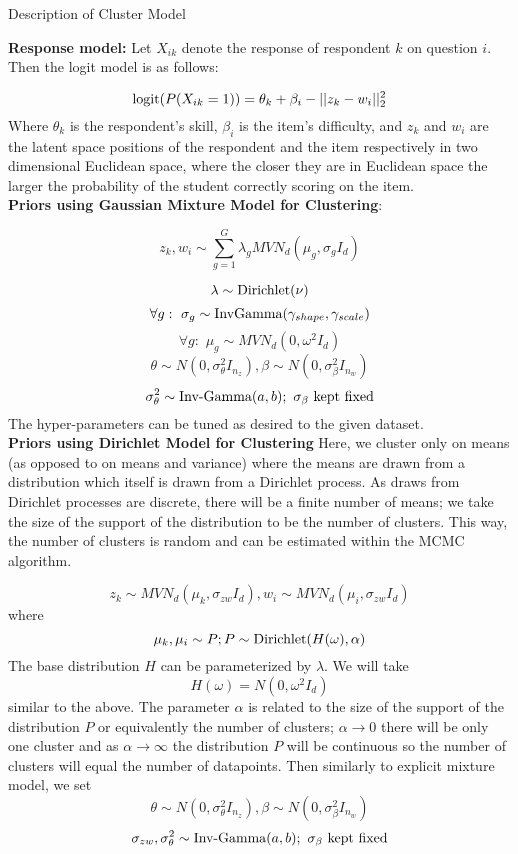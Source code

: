 \documentclass[12pt]{article}
\newcommand{\tx}[1]{\textnormal{#1}}
\begin{document}
	
	\begin{center}
		Description of Cluster Model
	\end{center}
	
\textbf{Response model:} Let $X_{ik}$ denote the response of respondent $k$ on question $i$. Then the logit model is as follows:

$$\tx{logit}(P(X_{ik}=1))=\theta_k+\beta_i-||z_k-w_i||_2^2$$ Where $\theta_k$ is the respondent's skill, $\beta_i$ is the item's difficulty, and $z_k$ and $w_i$ are the latent space positions of the respondent and the item respectively in two dimensional Euclidean space, where the closer they are in Euclidean space the larger the probability of the student correctly scoring on the item.\\


\textbf{Priors using Gaussian Mixture Model for Clustering}:

$$z_k,w_i\sim\sum_{g=1}^{G}\lambda_{g}MVN_d(\mu_{g},\sigma_{g}I_d)$$



$$\lambda\sim \tx{Dirichlet}(\nu)$$ $$\forall g:\,\,\sigma_{g}\sim \tx{InvGamma}(\gamma_{shape},\gamma_{scale})$$ $$\forall g:\,\,\mu_{g}\sim MVN_d(0,\omega^2I_d)$$
$$\theta\sim N(0,\sigma_\theta^2I_{n_z}),\beta\sim N(0,\sigma_\beta^2 I_{n_w})$$
$$\sigma_\theta^2\sim \tx{Inv-Gamma}(a,b);\tx{  }\sigma_\beta\tx{ kept fixed}$$
The hyper-parameters can be tuned as desired to the given dataset.\\
 
 \textbf{Priors using Dirichlet Model for Clustering} Here, we cluster only on means (as opposed to on means and variance) where the means are drawn from a distribution which itself is drawn from a Dirichlet process. As draws from Dirichlet processes are discrete, there will be a finite number of means; we take the size of the support of the distribution to be the number of clusters. This way, the number of clusters is random and can be estimated within the MCMC algorithm.
 
 $$z_k\sim MVN_d(\mu_{k},\sigma_{zw} I_d),w_i\sim MVN_d(\mu_{i},\sigma_{zw} I_d)$$ where $$\mu_k,\mu_i\sim P; P\sim\tx{Dirichlet}(H(\omega),\alpha)$$ The base distribution $H$ can be parameterized by $\lambda$. We will take $$H(\omega)=N(0,\omega^2I_d)$$ similar to the above. The parameter $\alpha$ is related to the size of the support of the distribution $P$ or equivalently the number of clusters; $\alpha\rightarrow 0$ there will be only one cluster and as $\alpha\rightarrow\infty$ the distribution $P$ will be continuous so the number of clusters will equal the number of datapoints. Then similarly to explicit mixture model, we set  $$\theta\sim N(0,\sigma_\theta^2I_{n_z}),\beta\sim N(0,\sigma_\beta^2 I_{n_w})$$
 $$\sigma_{zw},\sigma_\theta^2\sim \tx{Inv-Gamma}(a,b);\tx{  }\sigma_\beta\tx{ kept fixed}$$
 
\end{document}
